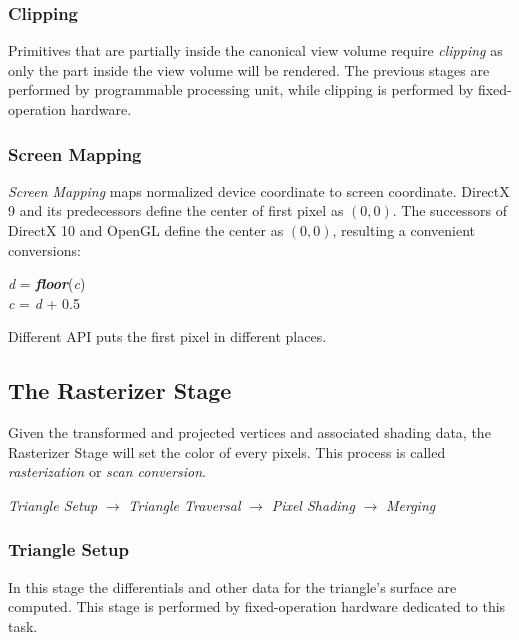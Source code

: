 \documentclass[10pt, a4paper]{article}
\begin{document}
            \subsubsection{Clipping} 
                Primitives that are partially inside the canonical view volume require \emph{clipping} as only the part inside the view volume will be rendered. The previous stages are performed by programmable processing unit, while clipping is performed by fixed-operation hardware. 
            
            \subsubsection{Screen Mapping} 
                \emph{Screen Mapping} maps normalized device coordinate to screen coordinate. DirectX 9 and its predecessors define the center of first pixel as $(0, 0)$. The successors of DirectX 10 and OpenGL define the center as $(0, 0)$, resulting a convenient conversions:\\
                \begin{center}
                    \large{\emph{d} = \textbf{\emph{floor}}(\emph{c})}\\
                    \large{\emph{c} = \emph{d} + 0.5}
                \end{center}

                \indent Different API puts the first pixel in different places. 
        
        \subsection{The Rasterizer Stage}
            Given the transformed and projected vertices and associated shading data, the Rasterizer Stage will set the color of every pixels. This process is called \emph{rasterization} or \emph{scan conversion}.
            \begin{center}
                \emph{Triangle Setup} $\to$ \emph{Triangle Traversal} $\to$ \emph{Pixel Shading} $\to$ \emph{Merging}
            \end{center}

            \subsubsection{Triangle Setup}
            In this stage the differentials and other data for the triangle's surface are computed. This stage is performed by fixed-operation hardware dedicated to this task.
            
\end{document}
